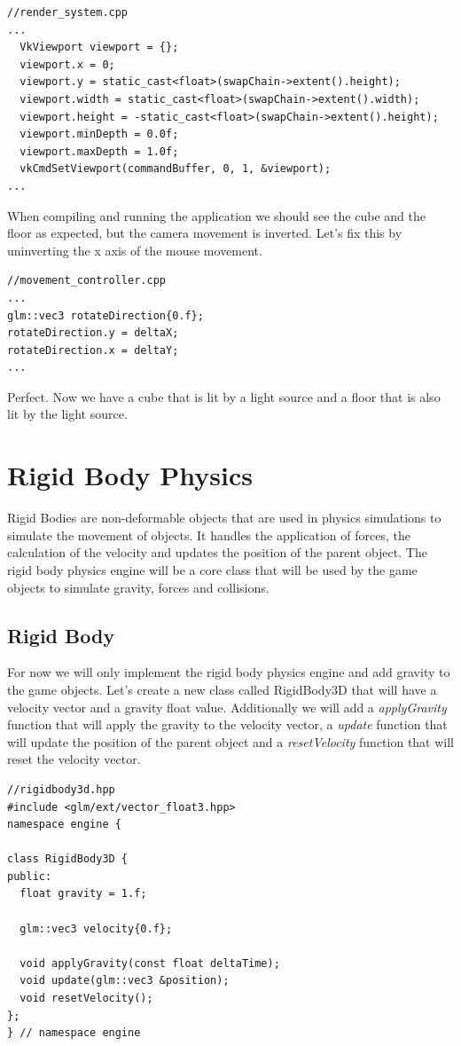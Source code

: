 \documentclass[12pt]{report} \usepackage{preamble}
\begin{document}
\begin{lstlisting}[Language=C++]
//render_system.cpp
...
  VkViewport viewport = {};
  viewport.x = 0;
  viewport.y = static_cast<float>(swapChain->extent().height);
  viewport.width = static_cast<float>(swapChain->extent().width);
  viewport.height = -static_cast<float>(swapChain->extent().height);
  viewport.minDepth = 0.0f;
  viewport.maxDepth = 1.0f;
  vkCmdSetViewport(commandBuffer, 0, 1, &viewport);
...
\end{lstlisting}

When compiling and running the application we should see the cube and the floor as expected, but the camera movement is inverted.
Let's fix this by uninverting the x axis of the mouse movement.

\begin{lstlisting}[Language=C++]
//movement_controller.cpp
...
glm::vec3 rotateDirection{0.f};
rotateDirection.y = deltaX;
rotateDirection.x = deltaY;
...
\end{lstlisting}

Perfect. Now we have a cube that is lit by a light source and a floor that is also lit by the light source.

\chapter{Rigid Body Physics}

Rigid Bodies are non-deformable objects that are used in physics simulations to simulate the movement of objects.
It handles the application of forces, the calculation of the velocity and updates the position of the parent object.
The rigid body physics engine will be a core class that will be used by the game objects to simulate gravity, forces and collisions.

\section{Rigid Body}

For now we will only implement the rigid body physics engine and add gravity to the game objects.
Let's create a new class called RigidBody3D that will have a velocity vector and a gravity float value.
Additionally we will add a \textit{applyGravity} function that will apply the gravity to the velocity vector,
a \textit{update} function that will update the position of the parent object and a \textit{resetVelocity}
function that will reset the velocity vector.

\begin{lstlisting}[Language=C++]
//rigidbody3d.hpp
#include <glm/ext/vector_float3.hpp>
namespace engine {

class RigidBody3D {
public:
  float gravity = 1.f;

  glm::vec3 velocity{0.f};

  void applyGravity(const float deltaTime);
  void update(glm::vec3 &position);
  void resetVelocity();
};
} // namespace engine
\end{lstlisting}
\end{document}
